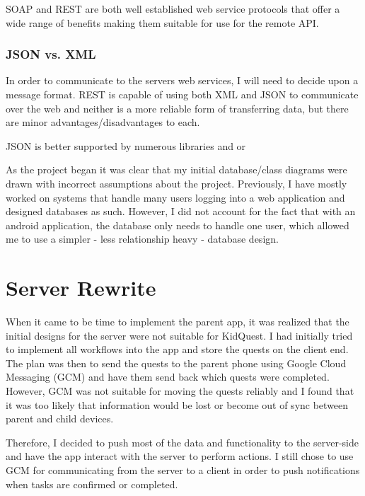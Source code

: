 SOAP and REST are both well established web service protocols that offer a wide range of benefits making them suitable for use for the remote API.


\subsubsection{JSON vs. XML}
In order to communicate to the servers web services, I will need to decide upon a message format. 
REST is capable of using both XML and JSON to communicate over the web and neither is a more reliable form of transferring data, but there are minor advantages/disadvantages to each.

JSON is better supported by numerous libraries and or






As the project began it was clear that my initial database/class diagrams were drawn with incorrect assumptions about the project. 
Previously, I have mostly worked on systems that handle many users logging into a web application and designed databases as such. 
However, I did not account for the fact that with an android application, the database only needs to handle one user, which allowed me to use a simpler - less relationship heavy - database design.

\section{Server Rewrite}
When it came to be time to implement the parent app, it was realized that the initial designs for the server were not suitable for KidQuest.
I had initially tried to implement all workflows into the app and store the quests on the client end. 
The plan was then to send the quests to the parent phone using Google Cloud Messaging (GCM) and have them send back which quests were completed.
However, GCM was not suitable for moving the quests reliably and I found that it was too likely that information would be lost or become out of sync between parent and child devices.

Therefore, I decided to push most of the data and functionality to the server-side and have the app interact with the server to perform actions.
I still chose to use GCM for communicating from the server to a client in order to push notifications when tasks are confirmed or completed.

